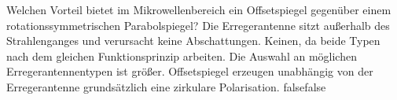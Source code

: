     {Welchen Vorteil bietet im Mikrowellenbereich ein Offsetspiegel gegenüber einem rotationssymmetrischen Parabolspiegel?}
    {Die Erregerantenne sitzt außerhalb des Strahlenganges und verursacht keine Abschattungen.}
    {Keinen, da beide Typen nach dem gleichen Funktionsprinzip arbeiten.}
    {Die Auswahl an möglichen Erregerantennentypen ist größer.}
    {Offsetspiegel erzeugen unabhängig von der Erregerantenne grundsätzlich eine  zirkulare Polarisation.}
    {false}{false}